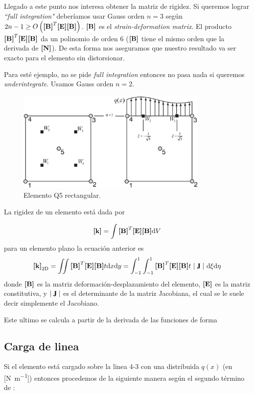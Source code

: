 Llegado a este punto nos interesa obtener la matriz de rigidez. Si queremos lograr \emph{``full integration"} deberíamos usar Gauss orden $n=3$ según $2n-1\geq O\left(\boldsymbol{[}\mathbf{B} \boldsymbol{]}^T \boldsymbol{[}\mathbf{E} \boldsymbol{]} \boldsymbol{[}\mathbf{B} \boldsymbol{]} \right)$. $\boldsymbol{[}\mathbf{B} \boldsymbol{]}$ es el \textit{strain-deformation matrix}. El producto $\boldsymbol{[}\mathbf{B} \boldsymbol{]}^T \boldsymbol{[}\mathbf{E} \boldsymbol{]} \boldsymbol{[}\mathbf{B} \boldsymbol{]}$ da un polinomio de orden 6 ($\boldsymbol{[}\mathbf{B} \boldsymbol{]}$ tiene el mismo orden que la derivada de $\boldsymbol{[}\mathbf{N} \boldsymbol{]}$). De esta forma nos aseguramos que nuestro resultado va ser exacto para el elemento sin distorsionar.

Para esté ejemplo, no se pide \emph{full integration} entonces no pasa nada si queremos \emph{underintegrate}. Usamos Gauss orden $n=2$. 

\begin{figure}[htb!]
    \centering
    \includegraphics[height=5cm]{fig/exoticElement.eps}
    \caption{Elemento Q5 rectangular.}
    \label{fig:elemq5}
\end{figure}

La rigidez de un elemento está dada por 


\begin{equation} \label{eq:RigidezElemento}
    \boldsymbol{[}\mathbf{k} \boldsymbol{]}=\int \boldsymbol{[}\mathbf{B} \boldsymbol{]}^T \boldsymbol{[}\mathbf{E} \boldsymbol{]} \boldsymbol{[}\mathbf{B} \boldsymbol{]} \textrm{d} V
\end{equation}
para un elemento plano la ecuación anterior es
\[
\Mk_{\mathrm{2D}}=\iint \MB^T \ME \MB t \di x \di y=\int^1_{-1}\int^1_{-1} \MB^T \ME \MB t \ \Djac \  \di\xi  \di\eta
\]
donde $\boldsymbol{[}\mathbf{B} \boldsymbol{]}$ es la matriz deformación-desplazamiento del elemento, $\boldsymbol{[}\mathbf{E} \boldsymbol{]}$ es la matriz constitutiva, y $\Djac$ es el determinante de la matriz Jacobiana, el cual se le suele decir simplemente el Jacobiano.

Este ultimo se calcula a partir de la derivada de las funciones de forma $ $

\subsection*{Carga de linea}
 Si el elemento está cargado sobre la linea 4-3 con una distribuida $q(x)$ (en [\si{\newton \per \meter}]) entonces procedemos de la siguiente manera según el segundo término de : 

